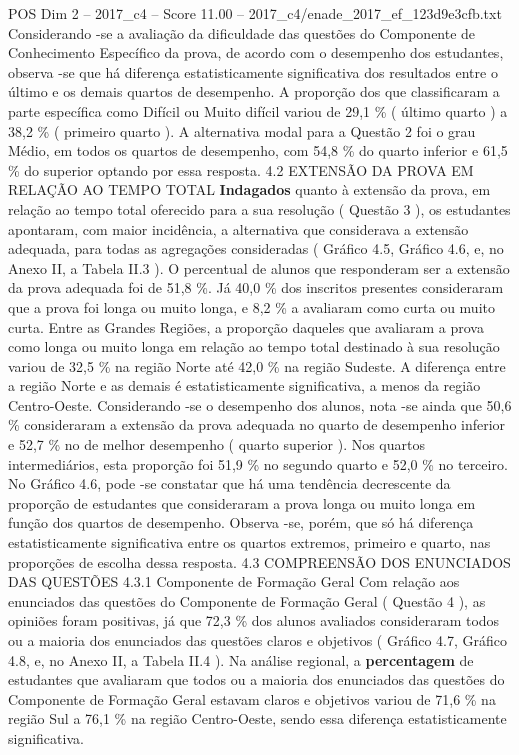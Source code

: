 \begin{textsample}{POS Dim 2 – 2017\_c4 – Score 11.00 – 2017\_c4/enade\_2017\_ef\_123d9e3cfb.txt}
Considerando -se a avaliação da dificuldade das questões do Componente de Conhecimento Específico da prova, de acordo com o desempenho dos estudantes, observa -se que há diferença estatisticamente significativa dos resultados entre o último e os demais quartos de desempenho.
A proporção dos que classificaram a parte específica como Difícil ou Muito difícil variou de 29,1 \% ( último quarto ) a 38,2 \% ( primeiro quarto ).
A alternativa modal para a Questão 2 foi o grau Médio, em todos os quartos de desempenho, com 54,8 \% do quarto inferior e 61,5 \% do superior optando por essa resposta. 4.2 EXTENSÃO DA PROVA EM RELAÇÃO AO TEMPO TOTAL \textbf{Indagados} quanto à extensão da prova, em relação ao tempo total oferecido para a sua resolução ( Questão 3 ), os estudantes apontaram, com maior incidência, a alternativa que considerava a extensão adequada, para todas as agregações consideradas ( Gráfico 4.5, Gráfico 4.6, e, no Anexo II, a Tabela II.3 ).
O percentual de alunos que responderam ser a extensão da prova adequada foi de 51,8 \%.
Já 40,0 \% dos inscritos presentes consideraram que a prova foi longa ou muito longa, e 8,2 \% a avaliaram como curta ou muito curta.
Entre as Grandes Regiões, a proporção daqueles que avaliaram a prova como longa ou muito longa em relação ao tempo total destinado à sua resolução variou de 32,5 \% na região Norte até 42,0 \% na região Sudeste.
A diferença entre a região Norte e as demais é estatisticamente significativa, a menos da região Centro-Oeste.
Considerando -se o desempenho dos alunos, nota -se ainda que 50,6 \% consideraram a extensão da prova adequada no quarto de desempenho inferior e 52,7 \% no de melhor desempenho ( quarto superior ).
Nos quartos intermediários, esta proporção foi 51,9 \% no segundo quarto e 52,0 \% no terceiro.
No Gráfico 4.6, pode -se constatar que há uma tendência decrescente da proporção de estudantes que consideraram a prova longa ou muito longa em função dos quartos de desempenho.
Observa -se, porém, que só há diferença estatisticamente significativa entre os quartos extremos, primeiro e quarto, nas proporções de escolha dessa resposta. 4.3 COMPREENSÃO DOS ENUNCIADOS DAS QUESTÕES 4.3.1 Componente de Formação Geral Com relação aos enunciados das questões do Componente de Formação Geral ( Questão 4 ), as opiniões foram positivas, já que 72,3 \% dos alunos avaliados consideraram todos ou a maioria dos enunciados das questões claros e objetivos ( Gráfico 4.7, Gráfico 4.8, e, no Anexo II, a Tabela II.4 ).
Na análise regional, a \textbf{percentagem} de estudantes que avaliaram que todos ou a maioria dos enunciados das questões do Componente de Formação Geral estavam claros e objetivos variou de 71,6 \% na região Sul a 76,1 \% na região Centro-Oeste, sendo essa diferença estatisticamente significativa.

\end{textsample}
